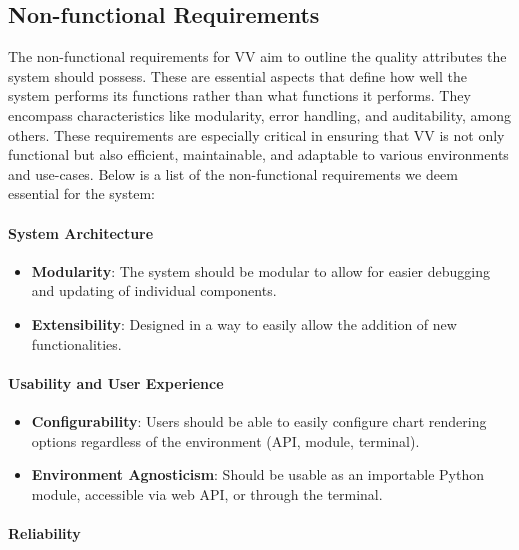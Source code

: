 \subsection{Non-functional
Requirements}\label{non-functional-requirements}

The non-functional requirements for VV aim to outline the quality
attributes the system should possess. These are essential aspects that
define how well the system performs its functions rather than what
functions it performs. They encompass characteristics like modularity,
error handling, and auditability, among others. These requirements are
especially critical in ensuring that VV is not only functional but also
efficient, maintainable, and adaptable to various environments and
use-cases. Below is a list of the non-functional requirements we deem
essential for the system:

\paragraph{System Architecture}\label{system-architecture}

\begin{itemize}
\item
  \textbf{Modularity}: The system should be modular to allow for easier
  debugging and updating of individual components.
\item
  \textbf{Extensibility}: Designed in a way to easily allow the addition
  of new functionalities.
\end{itemize}

\paragraph{Usability and User
Experience}\label{usability-and-user-experience}

\begin{itemize}
\item
  \textbf{Configurability}: Users should be able to easily configure
  chart rendering options regardless of the environment (API, module,
  terminal).
\item
  \textbf{Environment Agnosticism}: Should be usable as an importable
  Python module, accessible via web API, or through the terminal.
\end{itemize}

\paragraph{Reliability}\label{reliability}

